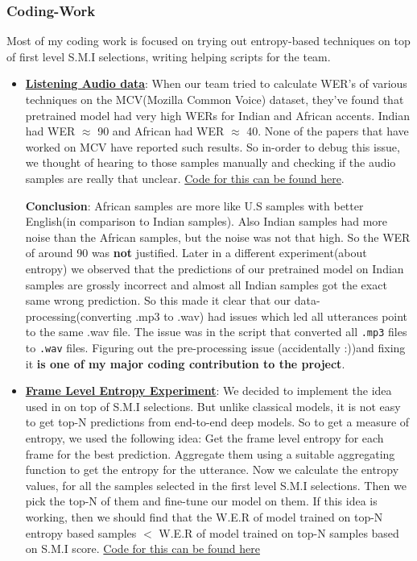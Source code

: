 \documentclass[12pt, a4paper, twoside]{article}
\begin{document}
\subsubsection{Coding-Work}
Most of my coding work is focused on trying out entropy-based techniques on top of first level S.M.I selections, writing helping scripts for the team.

\begin{itemize}
    \item \textbf{\underline{Listening Audio data}}: When our team tried to calculate  WER's of various techniques on the MCV(Mozilla Common Voice) dataset, they've found that pretrained model had very high WERs for Indian and African accents. Indian had WER $\approx$ 90 and African had WER $\approx$ 40. None of the papers that have worked on MCV have reported such results. So in-order to debug this issue, we thought of hearing to those samples manually and checking if the audio samples are really that unclear. \href{https://github.com/ChandraSekhar123331/RnD-Coding-Work/blob/master/Listening_Audio_Samples.ipynb}{Code for this can be found here}.

    \textbf{Conclusion}: African samples are more like U.S samples with better English(in comparison to Indian samples). Also Indian samples had more noise than the African samples, but the noise was not that high. So the WER of around 90 was \textbf{not} justified. Later in a different experiment(about entropy) we observed that the predictions of our pretrained model on Indian samples are grossly incorrect and almost all Indian samples got the exact same wrong prediction. So this made it clear that our data-processing(converting .mp3 to .wav) had issues which led all utterances point to the same .wav file. The issue was in the script that converted all \texttt{.mp3} files to \texttt{.wav} files. Figuring out the pre-processing issue (accidentally :))and fixing it \textbf{is one of my major coding contribution to the project}. 
    
    \item \underline{\textbf{Frame Level Entropy Experiment}}: We decided to implement the idea used in  \cite{itoh2012n} on top of S.M.I selections. But unlike classical models, it is not easy to get top-N predictions from end-to-end deep models. So to get a measure of entropy, we used the following idea: Get the frame level entropy for each frame for the best prediction. Aggregate them using a suitable aggregating function to get the entropy for the utterance. Now we calculate the entropy values, for all the samples selected in the first level S.M.I selections. Then we pick the top-N of them and fine-tune our model on them. If this idea is working, then we should find that the W.E.R of model trained on top-N entropy based samples $<$ W.E.R of model trained on top-N samples based on S.M.I score. \href{https://github.com/ChandraSekhar123331/RnD-Coding-Work/blob/master/entropy.py}{Code for this can be found here}
    

\end{itemize}
\end{document}
